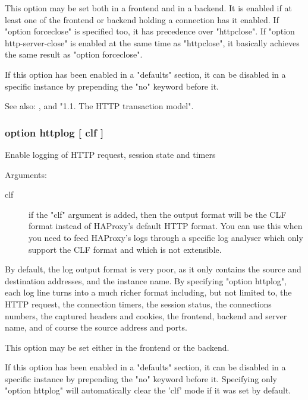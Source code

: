   This option may be set both in a frontend and in a backend. It is enabled if
  at least one of the frontend or backend holding a connection has it enabled.
  If "option forceclose" is specified too, it has precedence over "httpclose".
  If "option http-server-close" is enabled at the same time as "httpclose", it
  basically achieves the same result as "option forceclose".

  If this option has been enabled in a "defaults" section, it can be disabled
  in a specific instance by prepending the "no" keyword before it.

  See also: ,  and
             "1.1. The HTTP transaction model".

\subsubsection[option httplog]{option httplog [ clf ]}


  Enable logging of HTTP request, session state and timers


  Arguments:
  
\begin{description}
\item[clf]       if the "clf" argument is added, then the output format will be
              the CLF format instead of HAProxy's default HTTP format. You can
              use this when you need to feed HAProxy's logs through a specific
              log analyser which only support the CLF format and which is not
              extensible.
\end{description}

  By default, the log output format is very poor, as it only contains the
  source and destination addresses, and the instance name. By specifying
  "option httplog", each log line turns into a much richer format including,
  but not limited to, the HTTP request, the connection timers, the session
  status, the connections numbers, the captured headers and cookies, the
  frontend, backend and server name, and of course the source address and
  ports.

  This option may be set either in the frontend or the backend.

  If this option has been enabled in a "defaults" section, it can be disabled
  in a specific instance by prepending the "no" keyword before it. Specifying
  only "option httplog" will automatically clear the 'clf' mode if it was set
  by default.

